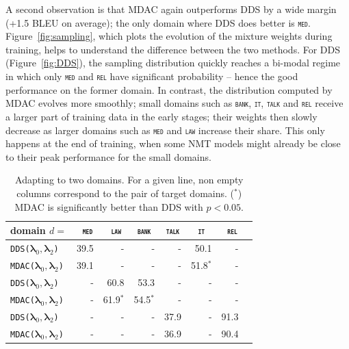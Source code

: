 \documentclass[11pt]{article}
\newcommand{\domain}[1]{\texttt{\textsc{#1}}}
\newcommand{\system}[1]{\texttt{{#1}}}
\newcommand{\vlambda}{\ensuremath{\boldsymbol\lambda}\xspace} %
\begin{document}
A second observation is that MDAC again outperforms DDS by a wide margin (+1.5 BLEU on average); the only domain where DDS does better is \domain{med}. Figure~\ref{fig:sampling}, which plots the evolution of the mixture weights during training, helps to understand the difference between the two methods. For DDS (Figure~\ref{fig:DDS}), the sampling distribution quickly reaches a bi-modal regime in which only \domain{med} and \domain{rel} have significant probability -- hence the good performance on the former domain. In contrast, the distribution computed by MDAC evolves more smoothly; small domains such as \domain{bank}, \domain{it}, \domain{talk} and \domain{rel} receive a larger part of training data in the early stages; their weights then slowly decrease as larger domains such as \domain{med} and \domain{law} increase their share. This only happens at the end of training, when some NMT models might already be close to their peak performance for the small domains.

\begin{table}[htbp]
  \vspace{\baselineskip}
  \centering \small
  \begin{tabular}{|l|*7{r|}} \hline
    domain \hfill $d=$ & \multicolumn{1}{c|}{\domain{ med}} & \multicolumn{1}{c|}{\domain{ law}} & \multicolumn{1}{c|}{\domain{bank}} & \multicolumn{1}{c|}{\domain{talk}} & \multicolumn{1}{c|}{\domain{ it }} & \multicolumn{1}{c|}{\domain{ rel}} \\ \hline \hline
    \system{DDS($\vlambda_0, \vlambda_2$)}&39.5&-&-&-&50.1&- \\
    \system{MDAC($\vlambda_0, \vlambda_2$)}&39.1&-&-&-&51.8$^*$&- \\
    \system{DDS($\vlambda_0, \vlambda_2$)}&-&60.8&53.3&-&-&- \\
    \system{MDAC($\vlambda_0, \vlambda_2$)}&-&61.9$^*$&54.5$^*$&-&-&- \\
    \system{DDS($\vlambda_0, \vlambda_2$)}&-&-&-&37.9&-&91.3 \\ 
    \system{MDAC($\vlambda_0, \vlambda_2$)}&-&-&-&36.9&-&90.4 \\
    \hline
  \end{tabular}
  \caption{Adapting to two domains. For a given line, non empty columns correspond to the pair of target domains. ($^*$) MDAC is significantly better than DDS with $p<0.05$.}
  \label{tab:bi-da}
\end{table}
\end{document}
